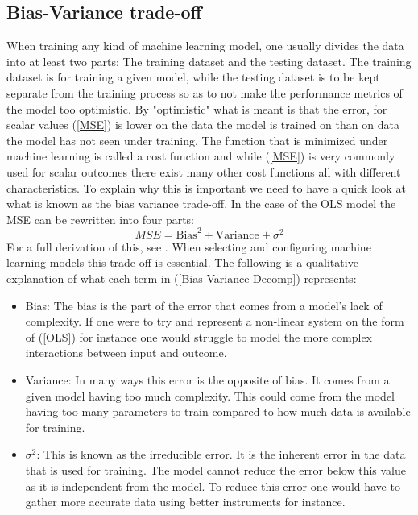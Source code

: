\subsection{Bias-Variance trade-off}
\label{Bias-Variance trade-off}
When training any kind of machine learning model, one usually divides the data 
into at least two parts: The training dataset and the testing dataset. The training 
dataset is for training a given model, while the testing dataset is to be kept separate 
from the training process so as to not make the performance metrics of the model too optimistic. 
By "optimistic" what is meant is that the error, for scalar values (\ref{MSE}) is 
lower on the data the model is trained on than on data the model has not seen under 
training. The function that is minimized under machine learning is called a 
cost function and while (\ref{MSE}) is very commonly used for scalar outcomes 
there exist many other cost functions all with different characteristics. \citationneeded
To explain 
why this is important we need to have a quick look at what is known as the 
bias variance trade-off.
In the case of the OLS model the MSE can be rewritten into four parts:
\begin{equation}
    MSE = \text{Bias}^2 + \text{Variance} + \sigma^2
    \label{Bias Variance Decomp}
\end{equation}
For a full derivation of this, see \citet{vijayakumar2007bias}. When selecting and 
configuring machine learning models this trade-off is essential. The following is 
a qualitative explanation of what each term in (\ref{Bias Variance Decomp})
represents:
\begin{itemize}
\item Bias: The bias is the part of the error that comes from a model's lack of complexity.  If one were to try and represent a non-linear system on the form of (\ref{OLS}) for instance one would struggle to model the more complex interactions between input and outcome.
\item Variance: In many ways this error is the opposite of bias. It comes from a given model having too much complexity. This could come from the model having too many parameters to train compared to how much data is available for training. 
\item $\sigma^2$: This is known as the irreducible error. It is the inherent error in the data that is used for training. The model cannot reduce the error below this value as it is independent from the model. To reduce this error one would have to gather more accurate data using better instruments for instance. 
\end{itemize}
